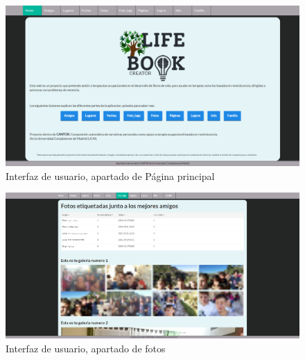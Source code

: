\begin{figure}
	\begin{center}
		\includegraphics[scale=0.3]{Imagenes/Fuentes/InterfazHome.png} \caption{Interfaz de usuario, apartado de Página principal}
		\label{WebAplication1_4}
	\end{center}
\end{figure}
\begin{figure}
	\begin{center}
		\includegraphics[scale=0.3]{Imagenes/Fuentes/InterfazFoto_tag.png} \caption{Interfaz de usuario, apartado de fotos}
		\label{WebAplication7_4}
	\end{center}
\end{figure}
